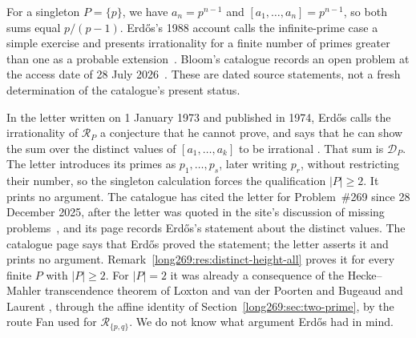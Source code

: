 \documentclass[11pt]{article}
\theoremstyle{remark}
\theoremstyle{plain}
\begin{document}
For a singleton $P=\{p\}$, we have $a_n=p^{n-1}$ and
$[a_1,\ldots,a_n]=p^{n-1}$, so both sums equal $p/(p-1)$.
Erd\H{o}s's 1988 account calls the infinite-prime case a simple exercise
and presents irrationality for a finite number of primes greater than one
as a probable extension~\cite[p.~106]{erdos1988}.
Bloom's catalogue records an open problem at the access date of
28 July 2026~\cite{erdosproblems}. These are dated source statements,
not a fresh determination of the catalogue's present status.

In the letter written on 1 January 1973 and published in 1974, Erd\H{o}s
calls the irrationality of $\mathcal R_P$ a conjecture that he cannot prove,
and says that he can show the sum over the distinct values of
$[a_1,\ldots,a_k]$ to be irrational \cite[p.~335]{erdos1974letter}.  That
sum is $\mathcal D_P$.  The letter introduces its primes as $p_1,\ldots,p_s$,
later writing $p_r$, without restricting their number, so the singleton
calculation forces the qualification $|P|\ge2$.  It prints no argument.  The
catalogue has cited the letter for Problem~\#269 since 28 December 2025,
after the letter was quoted in the site's discussion of missing
problems~\cite{erdosproblemsmissing}, and its page records Erd\H{o}s's
statement about the distinct values.
The catalogue page says that Erd\H{o}s proved the statement; the letter
asserts it and prints no argument.
Remark~\ref{long269:res:distinct-height-all} proves it for every finite
$P$ with $|P|\ge2$.  For $|P|=2$ it was already a consequence of the
Hecke--Mahler transcendence theorem of Loxton and van der Poorten
\cite[Theorem~8, p.~40]{loxtonvdp1977} and Bugeaud and Laurent
\cite[Theorem~1.1]{bugeaudlaurent2023}, through the affine identity of
Section~\ref{long269:sec:two-prime}, by the route Fan used for
$\mathcal R_{\{p,q\}}$.  We do not know what
argument Erd\H{o}s had in mind.
\end{document}

